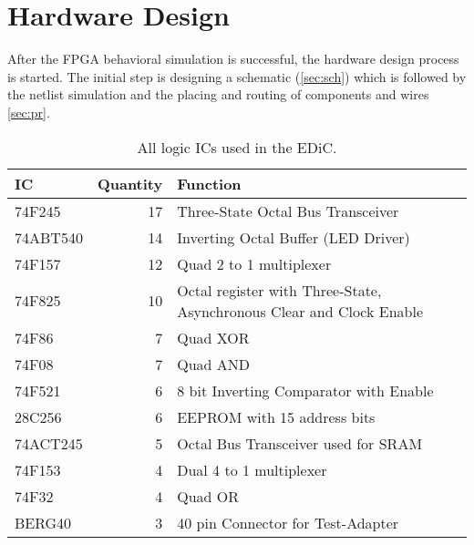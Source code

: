 \chapter{Hardware Design}\label{cha:hardware}
After the \gls{FPGA} behavioral simulation is successful, the hardware design process is started.
The initial step is designing a schematic (\cref{sec:sch}) which is followed by the netlist simulation and the placing and routing of components and wires \cref{sec:pr}.
\begin{table}[h]
  \centering
  \renewcommand{\arraystretch}{1.25}
  \caption{All logic \glspl{IC} used in the \gls{EDiC}.}
  \label{tab:cpuIcs}
  \begin{tabularx}{\textwidth}{ |l|r||X| }
    \hline
    \gls{IC}   & Quantity & Function                                                             \\\hline\hline
    74F245     & 17       & Three-State Octal Bus Transceiver                                    \\\hline
    74ABT540   & 14       & Inverting Octal Buffer (\gls{LED} Driver)                            \\\hline
    74F157     & 12       & Quad 2 to 1 multiplexer                                              \\\hline
    74F825     & 10       & Octal register with Three-State, Asynchronous Clear and Clock Enable \\\hline
    74F86      & 7        & Quad XOR                                                             \\\hline
    74F08      & 7        & Quad AND                                                             \\\hline
    74F521     & 6        & 8 bit Inverting Comparator with Enable                               \\\hline
    28C256     & 6        & \gls{EEPROM} with 15 address bits                                    \\\hline
    74ACT245   & 5        & Octal Bus Transceiver used for \gls{SRAM}                            \\\hline
    74F153     & 4        & Dual 4 to 1 multiplexer                                              \\\hline
    74F32      & 4        & Quad OR                                                              \\\hline
    BERG40     & 3        & 40 pin Connector for Test-Adapter                                    \\\hline

\end{tabularx}
\end{table}
